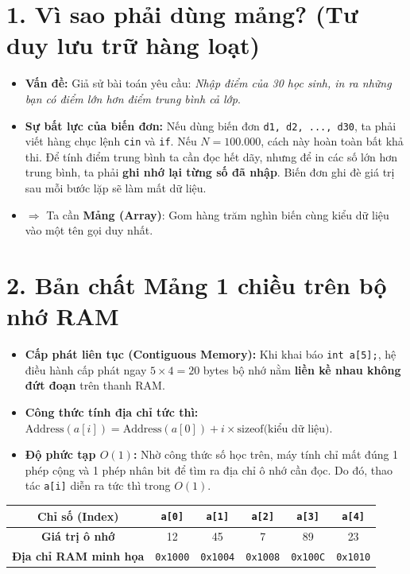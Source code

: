 \documentclass[11pt,a4paper]{article}
\begin{document}
\vspace{-0.15cm}
\section*{\color{AsianDarkBlue}\normalsize 1. Vì sao phải dùng mảng? (Tư duy lưu trữ hàng loạt)}
\vspace{-0.2cm}
\begin{itemize}
    \setlength{\itemsep}{1pt}
    \footnotesize
    \item \textbf{Vấn đề:} Giả sử bài toán yêu cầu: \textit{Nhập điểm của 30 học sinh, in ra những bạn có điểm lớn hơn điểm trung bình cả lớp}.
    \item \textbf{Sự bất lực của biến đơn:} Nếu dùng biến đơn \texttt{d1, d2, ..., d30}, ta phải viết hàng chục lệnh \texttt{cin} và \texttt{if}. Nếu $N = 100.000$, cách này hoàn toàn bất khả thi. Để tính điểm trung bình ta cần đọc hết dãy, nhưng để in các số lớn hơn trung bình, ta phải \textbf{ghi nhớ lại từng số đã nhập}. Biến đơn ghi đè giá trị sau mỗi bước lặp sẽ làm mất dữ liệu.
    \item $\Longrightarrow$ Ta cần \textbf{Mảng (Array)}: Gom hàng trăm nghìn biến cùng kiểu dữ liệu vào một tên gọi duy nhất.
\end{itemize}

\vspace{-0.25cm}
\section*{\color{AsianDarkBlue}\normalsize 2. Bản chất Mảng 1 chiều trên bộ nhớ RAM}
\vspace{-0.2cm}
\begin{itemize}
    \setlength{\itemsep}{1.5pt}
    \footnotesize
    \item \textbf{Cấp phát liên tục (Contiguous Memory):} Khi khai báo \texttt{int a[5];}, hệ điều hành cấp phát ngay $5 \times 4 = 20$ bytes bộ nhớ nằm \textbf{liền kề nhau không đứt đoạn} trên thanh RAM.
    \item \textbf{Công thức tính địa chỉ tức thì:} $\text{Address}(a[i]) = \text{Address}(a[0]) + i \times \text{sizeof(kiểu dữ liệu)}$.
    \item \textbf{Độ phức tạp $O(1)$:} Nhờ công thức số học trên, máy tính chỉ mất đúng 1 phép cộng và 1 phép nhân bit để tìm ra địa chỉ ô nhớ cần đọc. Do đó, thao tác \texttt{a[i]} diễn ra tức thì trong $O(1)$.
\end{itemize}

\begin{center}
\footnotesize
\begin{tabular}{|c|c|c|c|c|c|}
\hline
\textbf{Chỉ số (Index)} & \texttt{a[0]} & \texttt{a[1]} & \texttt{a[2]} & \texttt{a[3]} & \texttt{a[4]} \\
\hline
\textbf{Giá trị ô nhớ} & 12 & 45 & 7 & 89 & 23 \\
\hline
\textbf{Địa chỉ RAM minh họa} & \texttt{0x1000} & \texttt{0x1004} & \texttt{0x1008} & \texttt{0x100C} & \texttt{0x1010} \\
\hline
\end{tabular}
\end{center}
\end{document}
